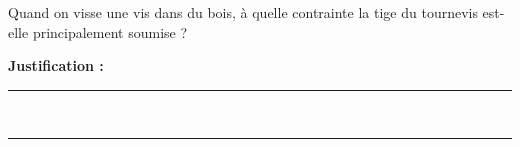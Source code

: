 Quand on visse une vis dans du bois, à quelle contrainte la tige du tournevis est-elle principalement soumise ?

\choices

\noindent\textbf{Justification :} \hrulefill \\[2.5ex]
\rule{\linewidth}{0.4pt} \\[2.5ex]
\rule{\linewidth}{0.4pt}
\vfill
